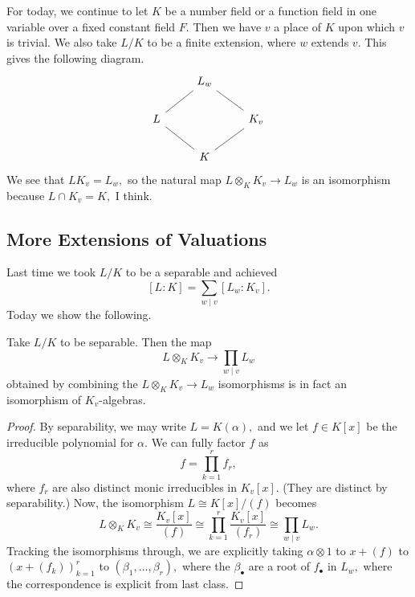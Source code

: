 \documentclass[../notes.tex]{subfiles}
\begin{document}













For today, we continue to let $K$ be a number field or a function field in one variable over a fixed constant field $F.$ Then we have $v$ a place of $K$ upon which $v$ is trivial. We also take $L/K$ to be a finite extension, where $w$ extends $v.$ This gives the following diagram.
\[\begin{tikzcd}
	& {L_w} \\
	L && {K_v} \\
	& K
	\arrow[no head, from=1-2, to=2-1]
	\arrow[no head, from=2-1, to=3-2]
	\arrow[no head, from=1-2, to=2-3]
	\arrow[no head, from=2-3, to=3-2]
\end{tikzcd}\]
We see that $LK_v=L_w,$ so the natural map $L\otimes_KK_v\to L_w$ is an isomorphism because $L\cap K_v=K,$ I think.\todo{}

\subsection{More Extensions of Valuations}
Last time we took $L/K$ to be a separable and achieved
\[[L:K]=\sum_{w\mid v}[L_w:K_v].\]
Today we show the following.
\begin{proposition}
	Take $L/K$ to be separable. Then the map
	\[L\otimes_KK_v\to\prod_{w\mid v}L_w\]
	obtained by combining the $L\otimes_KK_v\to L_w$ isomorphisms is in fact an isomorphism of $K_v$-algebras.
\end{proposition}
\begin{proof}
	By separability, we may write $L=K(\alpha),$ and we let $f\in K[x]$ be the irreducible polynomial for $\alpha.$ We can fully factor $f$ as
	\[f=\prod_{k=1}^rf_r,\]
	where $f_r$ are also distinct monic irreducibles in $K_v[x].$ (They are distinct by separability.) Now, the isomorphism $L\cong K[x]/(f)$ becomes
	\[L\otimes_KK_v\cong\frac{K_v[x]}{(f)}\cong\prod_{k=1}^r\frac{K_v[x]}{(f_r)}\cong\prod_{w\mid v}L_w.\]
	Tracking the isomorphisms through, we are explicitly taking $\alpha\otimes1$ to $x+(f)$ to $(x+(f_k))_{k=1}^r$ to $(\beta_1,\ldots,\beta_r),$ where the $\beta_\bullet$ are a root of $f_\bullet$ in $L_w,$ where the correspondence is explicit from last class.
\end{proof}
\end{document}
